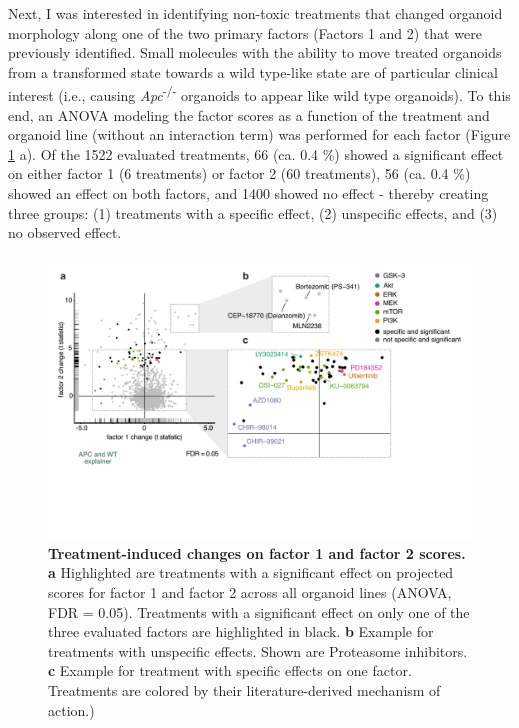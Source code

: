 \begin{flushleft}
Next, I was interested in identifying non-toxic treatments that changed organoid morphology along one of the two primary factors (Factors 1 and 2) that were previously identified. Small molecules with the ability to move treated organoids from a transformed state towards a wild type-like state are of particular clinical interest (i.e., causing \textit{Apc}\textsuperscript{-/-} organoids to appear like wild type organoids). To this end, an ANOVA modeling the factor scores as a function of the treatment and organoid line (without an interaction term) was performed for each factor (Figure \ref{fig_181} a). Of the 1522 evaluated treatments, 66 (ca. 0.4 \%) showed a significant effect on either factor 1 (6 treatments) or factor 2 (60 treatments), 56 (ca. 0.4 \%) showed an effect on both factors, and 1400 showed no effect - thereby creating three groups: (1) treatments with a specific effect, (2) unspecific effects, and (3) no observed effect. 

\begin{figure}[h]
\centering
\includegraphics[scale=0.75,
                keepaspectratio]{figures/adenomaprofiling/pdf/fig_5_3_1.pdf}
\caption[Treatment-induced changes on factor 1 and factor 2 scores]{\textbf{Treatment-induced changes on factor 1 and factor 2 scores. a} Highlighted are treatments with a significant effect on projected scores for factor 1 and factor 2 across all organoid lines (ANOVA, FDR = 0.05). Treatments with a significant effect on only one of the three evaluated factors are highlighted in black. \textbf{b} Example for treatments with unspecific effects. Shown are Proteasome inhibitors. \textbf{c} Example for treatment with specific effects on one factor. Treatments are colored by their literature-derived mechanism of action.)}
\label{fig_181}
\end{figure}
\bigbreak


\end{flushleft}
